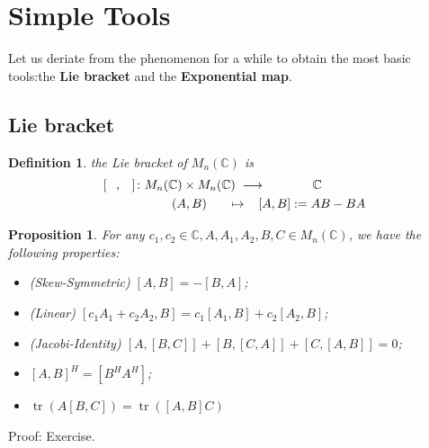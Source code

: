 \documentclass[11pt]{amsart}
\numberwithin{equation}{section}
\theoremstyle{plain}
\newtheorem{proposition}[theorem]{Proposition}
\newtheorem{defn}[theorem]{Definition}
\theoremstyle{plain}
\numberwithin{equation}{section}
\theoremstyle{remark}
\DeclareMathOperator{\tr}{tr}
\begin{document}
\section{Simple Tools}
Let us deriate from the phenomenon for a while to obtain the most basic tools:the \textbf{Lie bracket} and the \textbf{Exponential map}.
\subsection*{Lie bracket}
\begin{defn}
	the Lie bracket of $M_n(\mathbb{C})$ is
	\begin{equation*}
	\begin{aligned}{}
	[\phantom{A},\phantom{B}] \colon  M_n(&\mathbb{C}) \times  M_n(\mathbb{C})\; \longrightarrow \hspace{1.3cm}  \mathbb{C} \\
	&\;(A,B)\hspace{0.6cm} \mapsto \hspace{0.3cm}[A,B]:=AB-BA
	\end{aligned}
	\end{equation*}
\end{defn}
\begin{proposition}
	For any $c_1,c_2 \in \mathbb{C},A,A_1,A_2,B,C \in M_n(\mathbb{C})$, we have the following properties:
	\begin{itemize}
		\item (Skew-Symmetric) $[A,B]=-[B,A]$;
		\item (Linear) $[c_1A_1+c_2A_2,B]=c_1[A_1,B]+c_2[A_2,B]$;
		\item (Jacobi-Identity) $[A,[B,C]]+[B,[C,A]]+[C,[A,B]]=0$;
		\item $[A,B]^H=[B^HA^H]$;
		\item $\tr (A[B,C])=\tr ([A,B]C)$
	\end{itemize}
\end{proposition}
Proof: Exercise.
\end{document}
